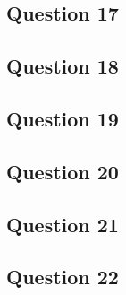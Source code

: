 \documentclass[]{template}
\begin{document}
    \subsection{Question 17}

    \subsection{Question 18}

    \subsection{Question 19}

    \subsection{Question 20}

    \subsection{Question 21}

    \subsection{Question 22}
\end{document}
